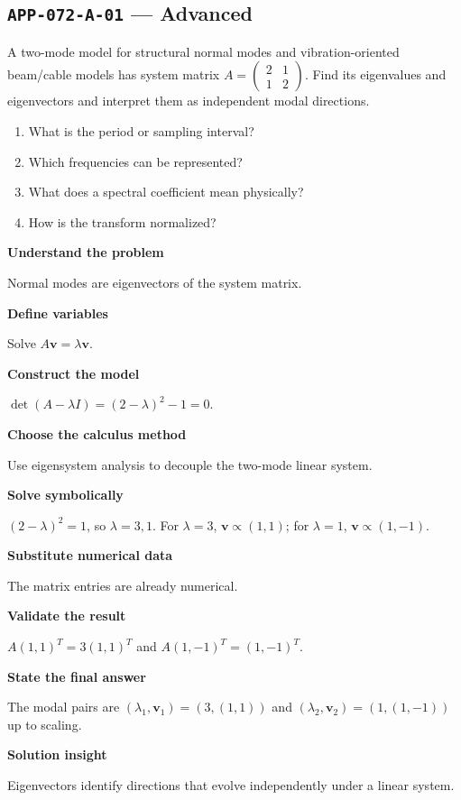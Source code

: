 \documentclass[11pt]{book}
\newcommand{\pid}[1]{\texttt{#1}}
\begin{document}
\subsection*{\pid{APP-072-A-01} — Advanced}
\begin{problembox}
A two-mode model for structural normal modes and vibration-oriented beam/cable models has system matrix $A=\begin{pmatrix}2&1\\1&2\end{pmatrix}$. Find its eigenvalues and eigenvectors and interpret them as independent modal directions.
\end{problembox}
\begin{promptbox}\begin{enumerate}
\item What is the period or sampling interval?
\item Which frequencies can be represented?
\item What does a spectral coefficient mean physically?
\item How is the transform normalized?
\end{enumerate}\end{promptbox}
\begin{solutionbox}
\textbf{Understand the problem}\par Normal modes are eigenvectors of the system matrix.\par\medskip
\textbf{Define variables}\par Solve $A\mathbf v=\lambda\mathbf v$.\par\medskip
\textbf{Construct the model}\par $\det(A-\lambda I)=(2-\lambda)^2-1=0$.\par\medskip
\textbf{Choose the calculus method}\par Use eigensystem analysis to decouple the two-mode linear system.\par\medskip
\textbf{Solve symbolically}\par $(2-\lambda)^2=1$, so $\lambda=3,1$. For $\lambda=3$, $\mathbf v\propto(1,1)$; for $\lambda=1$, $\mathbf v\propto(1,-1)$.\par\medskip
\textbf{Substitute numerical data}\par The matrix entries are already numerical.\par\medskip
\textbf{Validate the result}\par $A(1,1)^T=3(1,1)^T$ and $A(1,-1)^T=(1,-1)^T$.\par\medskip
\textbf{State the final answer}\par The modal pairs are $(\lambda_1,\mathbf v_1)=(3,(1,1))$ and $(\lambda_2,\mathbf v_2)=(1,(1,-1))$ up to scaling.\par\medskip
\textbf{Solution insight}\par Eigenvectors identify directions that evolve independently under a linear system.\par\medskip
\end{solutionbox}
\end{document}
